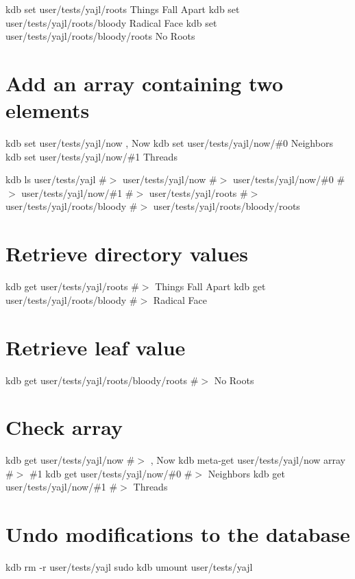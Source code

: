 kdb set user/tests/yajl/roots \textquotesingle{}Things Fall Apart\textquotesingle{} kdb set user/tests/yajl/roots/bloody \textquotesingle{}Radical Face\textquotesingle{} kdb set user/tests/yajl/roots/bloody/roots \textquotesingle{}No Roots\textquotesingle{}\hypertarget{autotoc_md726_autotoc_md746}{}\section{Add an array containing two elements}\label{autotoc_md726_autotoc_md746}
kdb set user/tests/yajl/now \textquotesingle{}, Now\textquotesingle{} kdb set user/tests/yajl/now/\#0 \textquotesingle{}Neighbors\textquotesingle{} kdb set user/tests/yajl/now/\#1 \textquotesingle{}Threads\textquotesingle{}

kdb ls user/tests/yajl \#$>$ user/tests/yajl/now \#$>$ user/tests/yajl/now/\#0 \#$>$ user/tests/yajl/now/\#1 \#$>$ user/tests/yajl/roots \#$>$ user/tests/yajl/roots/bloody \#$>$ user/tests/yajl/roots/bloody/roots\hypertarget{autotoc_md726_autotoc_md747}{}\section{Retrieve directory values}\label{autotoc_md726_autotoc_md747}
kdb get user/tests/yajl/roots \#$>$ Things Fall Apart kdb get user/tests/yajl/roots/bloody \#$>$ Radical Face\hypertarget{autotoc_md726_autotoc_md748}{}\section{Retrieve leaf value}\label{autotoc_md726_autotoc_md748}
kdb get user/tests/yajl/roots/bloody/roots \#$>$ No Roots\hypertarget{autotoc_md726_autotoc_md749}{}\section{Check array}\label{autotoc_md726_autotoc_md749}
kdb get user/tests/yajl/now \#$>$ , Now kdb meta-\/get user/tests/yajl/now array \#$>$ \#1 kdb get user/tests/yajl/now/\#0 \#$>$ Neighbors kdb get user/tests/yajl/now/\#1 \#$>$ Threads\hypertarget{autotoc_md726_autotoc_md750}{}\section{Undo modifications to the database}\label{autotoc_md726_autotoc_md750}
kdb rm -\/r user/tests/yajl sudo kdb umount user/tests/yajl 
\begin{DoxyCode}{0}
\DoxyCodeLine{}
\DoxyCodeLine{}
\end{DoxyCode}
